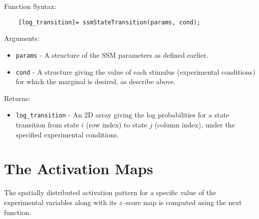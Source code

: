 Function Syntax:
\begin{verbatim}
    [log_transition]= ssmStateTransition(params, cond);
\end{verbatim}
Arguments:
\begin{itemize}
  \item \verb"params" - A structure of the SSM parameters as
  defined earlier.
  \item \verb"cond" - A structure giving the value of each stimulus
  (experimental conditions) for which the
  marginal is desired, as describe above.
\end{itemize}
Returns:
\begin{itemize}
    \item \verb"log_transition" - An 2D array giving the
    log probabilities for a state transition from
    state $i$ (row index) to state $j$ (column index),
    under the specified experimental conditions.
\end{itemize}





\section{The Activation Maps}
The spatially distributed activation pattern for a specific value of
the experimental variables along with its $z$--score map is computed
using the next function.

